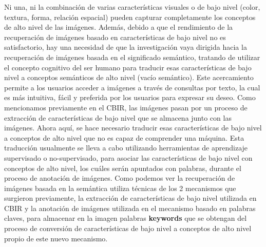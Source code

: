 \documentclass{llncs}
\begin{document}
Ni una, ni la combinación de varias características visuales o de bajo nivel (color, textura, forma, relación espacial) pueden capturar 
completamente los conceptos de alto nivel de las imágenes. Además, debido a que el rendimiento de la recuperación de imágenes basado en 
características de bajo nivel no es satisfactorio, hay una necesidad de que la investigación vaya dirigida hacia la recuperación de 
imágenes basada en el significado semántico, tratando de utilizar el concepto cognitivo del ser humano para traducir esas 
características de bajo nivel a conceptos semánticos de alto nivel (vacío semántico). Este acercamiento permite a los usuarios 
acceder a imágenes a través de consultas por texto, la cual es más intuitiva, fácil y preferida por los usuarios para expresar 
su deseo. Como mencionamos previamente en el CBIR, las imágenes pasan por un proceso de extracción de características de bajo nivel que 
se almacena junto con las imágenes. Ahora aquí, se hace necesario traducir esas características de bajo nivel a conceptos de alto nivel 
que no es capaz de comprender una máquina. Esta traducción usualmente se lleva a cabo utilizando herramientas de aprendizaje supervisado 
o no-supervisado, para asociar las características de bajo nivel con conceptos de alto nivel, los cuáles serán apuntados con palabras, 
durante el proceso de anotación de imágenes.
Como podemos ver la recuperación de imágenes basada en la semántica utiliza técnicas de los 2 mecanismos que surgieron previamente, 
la extracción de características de bajo nivel utilizada en CBIR y la anotación de imágenes utilizada en el mecanismo basado en 
palabras claves, para almacenar en la imagen palabras \textbf{keywords} que se obtengan del proceso de conversión de características de 
bajo nivel a conceptos de alto nivel propio de este nuevo mecanismo.
\end{document}
